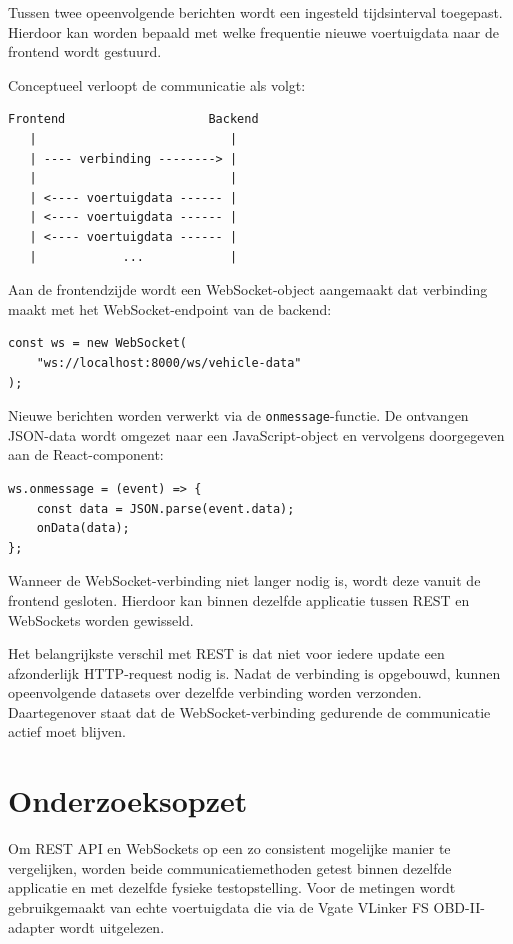 Tussen twee opeenvolgende berichten wordt een ingesteld tijdsinterval toegepast.
Hierdoor kan worden bepaald met welke frequentie nieuwe voertuigdata naar de
frontend wordt gestuurd.

Conceptueel verloopt de communicatie als volgt:

\begin{verbatim}
Frontend                    Backend
   |                           |
   | ---- verbinding --------> |
   |                           |
   | <---- voertuigdata ------ |
   | <---- voertuigdata ------ |
   | <---- voertuigdata ------ |
   |            ...            |
\end{verbatim}

Aan de frontendzijde wordt een WebSocket-object aangemaakt dat verbinding maakt
met het WebSocket-endpoint van de backend:

\begin{verbatim}
const ws = new WebSocket(
    "ws://localhost:8000/ws/vehicle-data"
);
\end{verbatim}

Nieuwe berichten worden verwerkt via de \texttt{onmessage}-functie. De
ontvangen JSON-data wordt omgezet naar een JavaScript-object en vervolgens
doorgegeven aan de React-component:

\begin{verbatim}
ws.onmessage = (event) => {
    const data = JSON.parse(event.data);
    onData(data);
};
\end{verbatim}

Wanneer de WebSocket-verbinding niet langer nodig is, wordt deze vanuit de
frontend gesloten. Hierdoor kan binnen dezelfde applicatie tussen REST en
WebSockets worden gewisseld.

Het belangrijkste verschil met REST is dat niet voor iedere update een
afzonderlijk HTTP-request nodig is. Nadat de verbinding is opgebouwd, kunnen
opeenvolgende datasets over dezelfde verbinding worden verzonden. Daartegenover
staat dat de WebSocket-verbinding gedurende de communicatie actief moet blijven.


\section{Onderzoeksopzet}

Om REST API en WebSockets op een zo consistent mogelijke manier te vergelijken,
worden beide communicatiemethoden getest binnen dezelfde applicatie en met
dezelfde fysieke testopstelling. Voor de metingen wordt gebruikgemaakt van echte
voertuigdata die via de Vgate VLinker FS OBD-II-adapter wordt uitgelezen.

